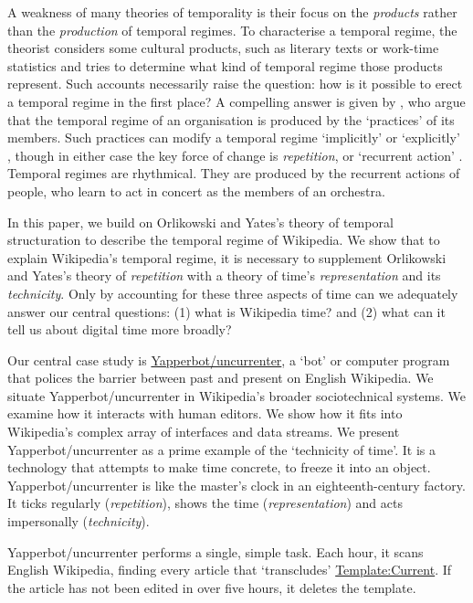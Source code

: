 \documentclass[
  Crown,
  times,
  sageh]{sagej}
\begin{document}
A weakness of many theories of temporality is their focus on the
\emph{products} rather than the \emph{production} of temporal regimes.
To characterise a temporal regime, the theorist considers some cultural
products, such as literary texts
\citep{gumbrecht_our_2014, hartog_regimes_2017} or work-time statistics
\citep{castells_rise_2010} and tries to determine what kind of temporal
regime those products represent. Such accounts necessarily raise the
question: how is it possible to erect a temporal regime in the first
place? A compelling answer is given by \citet{orlikowski_its_2002}, who
argue that the temporal regime of an organisation is produced by the
`practices' of its members. Such practices can modify a temporal regime
`implicitly' or `explicitly' \citeyearpar[p.~687]{orlikowski_its_2002},
though in either case the key force of change is \emph{repetition}, or
`recurrent action' \citeyearpar[p.~696]{orlikowski_its_2002}. Temporal
regimes are rhythmical. They are produced by the recurrent actions of
people, who learn to act in concert as the members of an orchestra.

In this paper, we build on Orlikowski and Yates's theory of temporal
structuration to describe the temporal regime of Wikipedia. We show that
to explain Wikipedia's temporal regime, it is necessary to supplement
Orlikowski and Yates's theory of \emph{repetition} with a theory of
time's \emph{representation} and its \emph{technicity}. Only by
accounting for these three aspects of time can we adequately answer our
central questions: (1) what is Wikipedia time? and (2) what can it tell
us about digital time more broadly?

Our central case study is
\href{https://en.wikipedia.org/wiki/User:Yapperbot}{Yapperbot/uncurrenter},
a `bot' or computer program that polices the barrier between past and
present on English Wikipedia. We situate Yapperbot/uncurrenter in
Wikipedia's broader sociotechnical systems. We examine how it interacts
with human editors. We show how it fits into Wikipedia's complex array
of interfaces and data streams. We present Yapperbot/uncurrenter as a
prime example of the `technicity of time'. It is a technology that
attempts to make time concrete, to freeze it into an object.
Yapperbot/uncurrenter is like the master's clock in an
eighteenth-century factory. It ticks regularly (\emph{repetition}),
shows the time (\emph{representation}) and acts impersonally
(\emph{technicity}).

Yapperbot/uncurrenter performs a single, simple task. Each hour, it
scans English Wikipedia, finding every article that `transcludes'
\href{https://en.wikipedia.org/wiki/Template:Current}{Template:Current}.
If the article has not been edited in over five hours, it deletes the
template.
\end{document}
